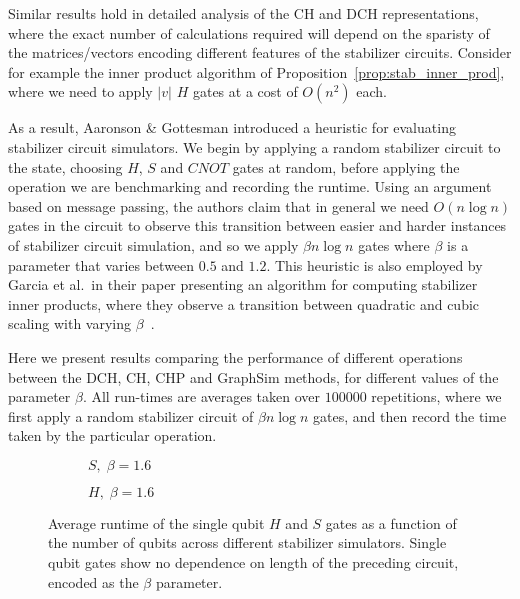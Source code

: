 Similar results hold in detailed analysis of the CH and DCH representations, where the exact number of calculations required will depend on the sparisty of the matrices/vectors encoding different features of the stabilizer circuits. Consider for example the inner product algorithm of Proposition~\ref{prop:stab_inner_prod}, where we need to apply $\vert v\vert$ $H$ gates at a cost of $O(n^{2})$ each.\par
As a result, Aaronson \& Gottesman introduced a heuristic for evaluating stabilizer circuit simulators. We begin by applying a random stabilizer circuit to the state, choosing $H$, $S$ and $CNOT$ gates at random, before applying the operation we are benchmarking and recording the runtime. Using an argument based on message passing, the authors claim that in general we need $O(n\log{n})$ gates in the circuit to observe this transition between easier and harder instances of stabilizer circuit simulation, and so we apply $\beta n\log{n}$ gates where $\beta$ is a parameter that varies between $0.5$ and $1.2$. This heuristic is also employed by Garcia et al.\ in their paper presenting an algorithm for computing stabilizer inner products, where they observe a transition between quadratic and cubic scaling with varying $\beta$~\cite{Garcia2012}.\par
Here we present results comparing the performance of different operations between the DCH, CH, CHP and GraphSim methods, for different values of the parameter $\beta$. All run-times are averages taken over $100000$ repetitions, where we first apply a random stabilizer circuit of $\beta n\log{n}$ gates, and then record the time taken by the particular operation.\par
\begin{figure}[p]
\centering
\begin{subfigure}[t]{0.48\textwidth}
    \centering
    \caption{$S,\;\beta=1.6$}
    \begin{scaletikzpicturetowidth}{\textwidth}
        
    \end{scaletikzpicturetowidth}
\end{subfigure}
\begin{subfigure}[t]{0.48\textwidth}
    \centering
    \caption{$H,\;\beta=1.6$}
    \begin{scaletikzpicturetowidth}{\textwidth}
        
    \end{scaletikzpicturetowidth}
\end{subfigure}
\caption{Average runtime of the single qubit $H$ and $S$ gates as a function of the number of qubits across different stabilizer simulators. Single qubit gates show no dependence on length of the preceding circuit, encoded as the $\beta$ parameter.}
\label{fig:single_qubit_clifford_timings}
\end{figure}
